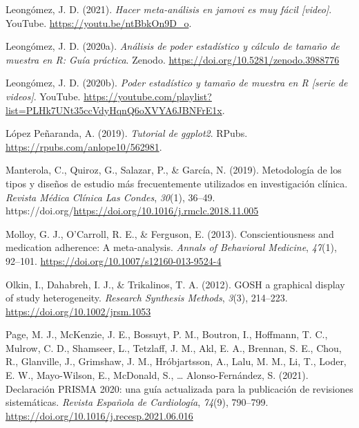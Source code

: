 \documentclass[
  bookmarksnumbered]{article}
\newlength{\cslhangindent}
\newlength{\cslentryspacingunit} %
\newenvironment{CSLReferences}[2] %
 {%
  \setlength{\parindent}{0pt}
  \ifodd #1
  \let\oldpar\par
  \def\par{\hangindent=\cslhangindent\oldpar}
  \fi
  \setlength{\parskip}{#2\cslentryspacingunit}
 }%
 {}
\begin{document}
\begin{CSLReferences}{1}{0}
\leavevmode{}%
Leongómez, J. D. (2021). \emph{Hacer meta-análisis en jamovi es muy fácil \emph{{[}video{]}}}. YouTube. \url{https://youtu.be/ntBbkOn9D_o}.

\leavevmode{}%
Leongómez, J. D. (2020a). \emph{Análisis de poder estadístico y cálculo de tamaño de muestra en {R}: {Guía} práctica}. {Zenodo}. \url{https://doi.org/10.5281/zenodo.3988776}

\leavevmode{}%
Leongómez, J. D. (2020b). \emph{Poder estadístico y tamaño de muestra en {R} \emph{{[}serie de videos{]}}}. YouTube. \url{https://youtube.com/playlist?list=PLHk7UNt35ccVdyHqnQ6oXVYA6JBNFrE1x}.

\leavevmode{}%
López Peñaranda, A. (2019). \emph{Tutorial de ggplot2}. RPubs. \url{https://rpubs.com/anlope10/562981}.

\leavevmode{}%
Manterola, C., Quiroz, G., Salazar, P., \& García, N. (2019). Metodología de los tipos y diseños de estudio más frecuentemente utilizados en investigación clínica. \emph{Revista Médica Clínica Las Condes}, \emph{30}(1), 36--49. https://doi.org/\url{https://doi.org/10.1016/j.rmclc.2018.11.005}

\leavevmode{}%
Molloy, G. J., O'Carroll, R. E., \& Ferguson, E. (2013). Conscientiousness and medication adherence: A meta-analysis. \emph{Annals of Behavioral Medicine}, \emph{47}(1), 92--101. \url{https://doi.org/10.1007/s12160-013-9524-4}

\leavevmode{}%
Olkin, I., Dahabreh, I. J., \& Trikalinos, T. A. (2012). {GOSH} \textendash{} a graphical display of study heterogeneity. \emph{Research Synthesis Methods}, \emph{3}(3), 214--223. \url{https://doi.org/10.1002/jrsm.1053}

\leavevmode{}%
Page, M. J., McKenzie, J. E., Bossuyt, P. M., Boutron, I., Hoffmann, T. C., Mulrow, C. D., Shamseer, L., Tetzlaff, J. M., Akl, E. A., Brennan, S. E., Chou, R., Glanville, J., Grimshaw, J. M., Hróbjartsson, A., Lalu, M. M., Li, T., Loder, E. W., Mayo-Wilson, E., McDonald, S., \ldots{} Alonso-Fernández, S. (2021). {Declaración PRISMA 2020: una guía actualizada para la publicación de revisiones sistemáticas}. \emph{Revista Española de Cardiología}, \emph{74}(9), 790--799. \url{https://doi.org/10.1016/j.recesp.2021.06.016}


\end{CSLReferences}
\end{document}
